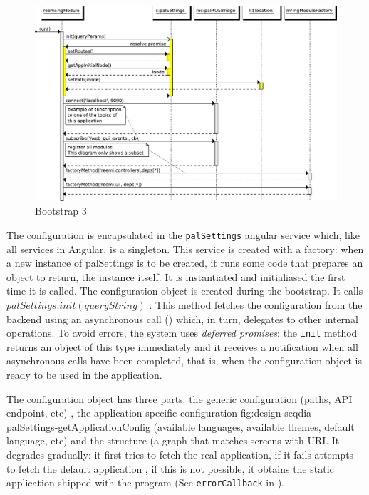 \begin{figure}[htb]
    \centering
    \includegraphics{figures/design/seqdia/bootstrap-3.pdf}
    \caption{Bootstrap 3}
    \label{fig:design-seqdia-bootstrap-3}
\end{figure}

The configuration is encapsulated in the \texttt{palSettings} angular service which, like all services in Angular, is a singleton.
This service is created with a factory: when a new instance of palSettings is to be created, it runs some code that prepares an object to return, the instance itself.
It is instantiated and initialiased the first time it is called.
The configuration object is created during the bootstrap.
It calls $palSettings.init(queryString)$ .
This method fetches the configuration from the backend using an asynchronous call () which, in turn, delegates to other internal operations.
To avoid errors, the system uses \emph{deferred promises}: the \texttt{init} method returns an object of this type immediately and it receives a notification when all asynchronous calls have been completed, that is, when the configuration object is ready to be used in the application.

The configuration object has three parts: the generic configuration (paths, \ac{API} endpoint, etc) , the application specific configuration {fig:design-seqdia-palSettings-getApplicationConfig} (available languages, available themes, default language, etc) and the structure  (a graph that matches screens with \ac{URI}.
It degrades gradually: it first tries to fetch the real application, if it fails attempts to fetch the default application , if this is not possible, it obtains the static application shipped with the program (See \texttt{errorCallback} in ).

